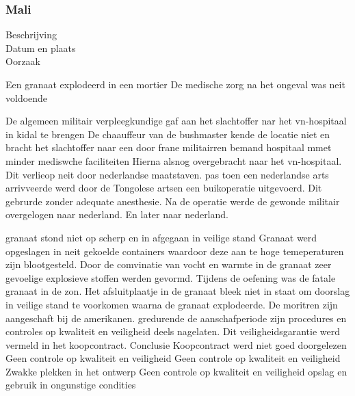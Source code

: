 \cite{owens21032017ukrainemitigationstrategies}
\cite{cerulus2019FrontlineRussiaAttack}
\cite{grammatikis2019AttackIEC6087505104}
\cite{hidajat2016ScadaSimulator}
\cite{uscert20072021crashmalware}
\cite{zetter12062017malwareanalysis}
\cite{icsRussianHackingCyberWeapon}
\cite{usgovC2M2}
 

 


\subsubsection{Mali}

\begin{description}
\item[Beschrijving]
\item[Datum en plaats] 
\item[Oorzaak]
\end{description}
Een granaat explodeerd in een mortier
De medische zorg na het ongeval was neit voldoende


De algemeen militair verpleegkundige gaf aan het slachtoffer nar het vn-hospitaal in kidal te brengen
De chaauffeur van de bushmaster kende de locatie niet  en bracht het slachtoffer naar een door frane militairren bemand hospitaal mmet minder mediswche faciliteiten
Hierna alsnog overgebracht naar het vn-hospitaal.
Dit verlieop  neit door nederlandse maatstaven.
pas toen een nederlandse arts arrivveerde werd door de Tongolese artsen een buikoperatie uitgevoerd.
Dit gebrurde zonder adequate anesthesie.
Na de operatie werde de gewonde militair overgelogen naar nederland. En later naar nederland.


granaat stond niet op scherp en in afgegaan in veilige stand
Granaat werd opgeslagen in neit gekoelde containers waardoor deze aan te hoge temeperaturen zijn blootgesteld.
Door de comvinatie van vocht en warmte in de granaat zeer gevoelige explosieve stoffen werden gevormd.
Tijdens de oefening was de fatale granaat in de zon.
Het afsluitplaatje in de granaat bleek niet in staat om doorslag in veilige stand te voorkomen waarna de granaat explodeerde.
De moritren zijn aangeschaft bij de amerikanen. gredurende de aanschafperiode zijn procedures en controles op kwaliteit en veiligheid deels nagelaten.
Dit veiligheidsgarantie werd vermeld in het koopcontract.
Conclusie
Koopcontract werd niet goed doorgelezen
Geen controle op kwaliteit en veiligheid
Geen controle op kwaliteit en veiligheid
Zwakke plekken in het ontwerp
Geen controle op kwaliteit en veiligheid
opslag en gebruik in ongunstige condities

